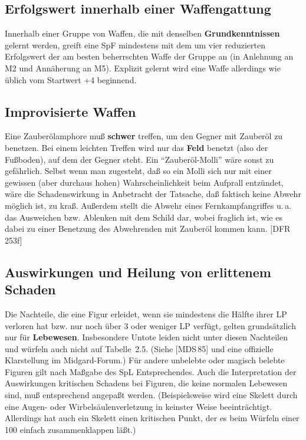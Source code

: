 \documentclass[10pt,a4paper,germanpar]{article}
\begin{document}
% 

\subsection{Erfolgswert innerhalb einer Waffengattung}

Innerhalb einer Gruppe von Waffen, die mit denselben
\textbf{Grundkenntnissen} gelernt werden, greift eine SpF mindestens
mit dem um vier reduzierten Erfolgswert der am besten beherrschten
Waffe der Gruppe an (in Anlehnung an M2 und Annäherung an
M5). Explizit gelernt wird eine Waffe allerdings wie üblich vom
Startwert +4 beginnend.

\subsection{Improvisierte Waffen}

Eine Zauberölamphore muß \textbf{schwer} treffen, um den Gegner mit
Zauberöl zu benetzen.  Bei einem leichten Treffen wird nur das
\textbf{Feld} benetzt (also der Fußboden), auf dem der Gegner steht.
Ein "`Zauberöl-Molli"' wäre sonst zu gefährlich. Selbst wenn man
zugesteht, daß so ein Molli sich nur mit einer gewissen (aber durchaus
hohen) Wahrscheinlichkeit beim Aufprall entzündet, wäre die
Schadenswirkung in Anbetracht der Tatsache, daß faktisch keine Abwehr
möglich ist, zu kraß. Außerdem stellt die Abwehr eines
Fernkampfangriffes u.\,a. das Ausweichen bzw. Ablenken mit dem Schild
dar, wobei fraglich ist, wie es dabei zu einer Benetzung des
Abwehrenden mit Zauberöl kommen kann. [DFR\,253f]

\subsection{Auswirkungen und Heilung von erlittenem Schaden}

Die Nachteile, die eine Figur erleidet, wenn sie mindestens die Hälfte
ihrer LP verloren hat bzw. nur noch über 3 oder weniger LP verfügt,
gelten grundsätzlich nur für \textbf{Lebewesen}. Insbesondere Untote
leiden nicht unter diesen Nachteilen und würfeln auch nicht auf
Tabelle~2.5. (Siehe [MDS\,85] und eine offizielle Klarstellung im
Midgard-Forum.) Für andere unbelebte oder magisch belebte Figuren gilt
nach Maßgabe des SpL Entsprechendes. Auch die Interpretation
der Auswirkungen kritischen Schadens bei Figuren, die keine normalen
Lebewesen sind, muß entsprechend angepaßt werden. (Beispielsweise wird
eine Skelett durch eine Augen- oder Wirbelsäulenverletzung in keinster
Weise beeinträchtigt. Allerdings hat auch ein Skelett einen kritischen
Punkt, der es beim Würfeln einer 100 einfach zusammenklappen läßt.)
\end{document}
